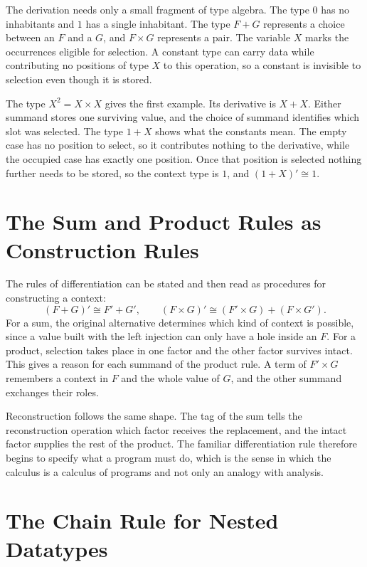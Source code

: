 \documentclass[11pt]{article}
\begin{document}
The derivation needs only a small fragment of type algebra. The type $0$ has no inhabitants and $1$ has a single inhabitant. The type $F+G$ represents a choice between an $F$ and a $G$, and $F\times G$ represents a pair. The variable $X$ marks the occurrences eligible for selection. A constant type can carry data while contributing no positions of type $X$ to this operation, so a constant is invisible to selection even though it is stored.

The type $X^2 = X\times X$ gives the first example. Its derivative is $X+X$. Either summand stores one surviving value, and the choice of summand identifies which slot was selected. The type $1+X$ shows what the constants mean. The empty case has no position to select, so it contributes nothing to the derivative, while the occupied case has exactly one position. Once that position is selected nothing further needs to be stored, so the context type is $1$, and $(1+X)'\cong 1$.

\section{The Sum and Product Rules as Construction Rules}

The rules of differentiation can be stated and then read as procedures for constructing a context:
\[
(F+G)' \cong F'+G',
\qquad
(F\times G)' \cong (F'\times G)+(F\times G').
\]
For a sum, the original alternative determines which kind of context is possible, since a value built with the left injection can only have a hole inside an $F$. For a product, selection takes place in one factor and the other factor survives intact. This gives a reason for each summand of the product rule. A term of $F'\times G$ remembers a context in $F$ and the whole value of $G$, and the other summand exchanges their roles.

Reconstruction follows the same shape. The tag of the sum tells the reconstruction operation which factor receives the replacement, and the intact factor supplies the rest of the product. The familiar differentiation rule therefore begins to specify what a program must do, which is the sense in which the calculus is a calculus of programs and not only an analogy with analysis.

\section{The Chain Rule for Nested Datatypes}
\end{document}

